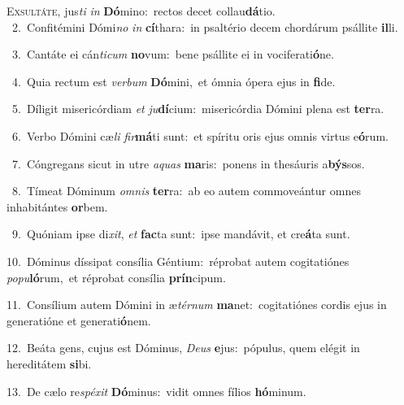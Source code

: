 \lettrine{\initial\textcolor{\initialcolor}{E}}{xsultáte,} jus\textit{ti} \textit{in} \textbf{Dó}\-mino:~\star rectos decet collau\-\textbf{dá}\-tio.\\
{\numbfont\textcolor{\numbcolor}{~2.}}~Confitémini Dómi\textit{no} \textit{in} \textbf{cí}\-thara:~\star in psaltério decem chordárum psállite \textbf{il}\-li.\par
{\numbfont\textcolor{\numbcolor}{~3.}}~Cantáte ei cán\-\textit{ti}\-\textit{cum} \textbf{no}\-vum:~\star bene psállite ei in vociferati\-\textbf{ó}\-ne.\par
{\numbfont\textcolor{\numbcolor}{~4.}}~Quia rectum est \textit{ver}\-\textit{bum} \textbf{Dó}\-mini,~\star et ómnia ópera ejus in \textbf{fi}\-de.\par
{\numbfont\textcolor{\numbcolor}{~5.}}~Díligit misericórdiam \textit{et} \textit{ju}\-\textbf{dí}cium:~\star misericórdia Dómini plena est \textbf{ter}\-ra.\par
{\numbfont\textcolor{\numbcolor}{~6.}}~Verbo Dómini cæ\textit{li} \textit{fir}\-\textbf{má}ti sunt:~\star et spíritu oris ejus omnis virtus e\-\textbf{ó}\-rum.\par
{\numbfont\textcolor{\numbcolor}{~7.}}~Cóngregans sicut in utre \textit{a}\-\textit{quas} \textbf{ma}\-ris:~\star ponens in thesáuris a\-\textbf{býs}\-sos.\par
{\numbfont\textcolor{\numbcolor}{~8.}}~Tímeat Dóminum \textit{om}\-\textit{nis} \textbf{ter}\-ra:~\star ab eo autem commoveántur omnes inhabitántes \textbf{or}\-bem.\par
{\numbfont\textcolor{\numbcolor}{~9.}}~Quóniam ipse di\-\textit{xit}\-, \textit{et} \textbf{fac}\-ta sunt:~\star ipse mandávit, et cre\-\textbf{á}\-ta sunt.\par
{\numbfont\textcolor{\numbcolor}{10.}}~Dóminus díssipat consília Géntium:~\dagger réprobat autem cogitatiónes \textit{po}\-\textit{pu}\textbf{ló}rum,~\star et réprobat consília \textbf{prín}\-cipum.\par
{\numbfont\textcolor{\numbcolor}{11.}}~Consílium autem Dómini in æ\-\textit{tér}\-\textit{num} \textbf{ma}\-net:~\star cogitatiónes cordis ejus in generatióne et generati\-\textbf{ó}\-nem.\par
{\numbfont\textcolor{\numbcolor}{12.}}~Beáta gens, cujus est Dóminus, \textit{De}\-\textit{us} \textbf{e}\-jus:~\star pópulus, quem elégit in hereditátem \textbf{si}\-bi.\par
{\numbfont\textcolor{\numbcolor}{13.}}~De cælo re\-\textit{spé}\-\textit{xit} \textbf{Dó}\-minus:~\star vidit omnes fílios \textbf{hó}\-minum.\par
